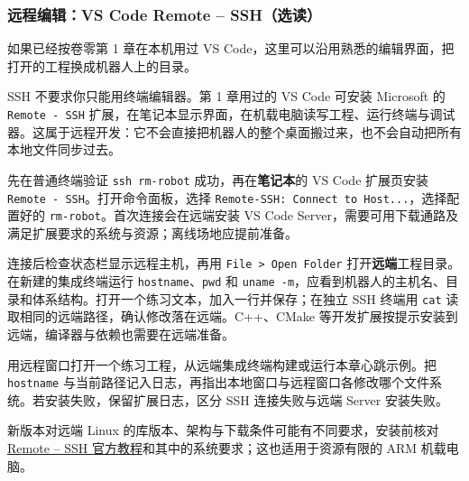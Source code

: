 \subsubsection{远程编辑：VS Code Remote -- SSH（选读）}
如果已经按卷零第 1 章在本机用过 VS Code，这里可以沿用熟悉的编辑界面，把打开的工程换成机器人上的目录。


SSH 不要求你只能用终端编辑器。第 1 章用过的 VS Code 可安装 Microsoft 的 \texttt{Remote - SSH} 扩展，在笔记本显示界面，在机载电脑读写工程、运行终端与调试器。这属于远程开发：它不会直接把机器人的整个桌面搬过来，也不会自动把所有本地文件同步过去。

\begin{example}[确认编辑与编译发生在哪台电脑]
先在普通终端验证 \texttt{ssh rm-robot} 成功，再在\textbf{笔记本}的 VS Code 扩展页安装 \texttt{Remote - SSH}。打开命令面板，选择 \texttt{Remote-SSH: Connect to Host...}，选择配置好的 \texttt{rm-robot}。首次连接会在远端安装 VS Code Server，需要可用下载通路及满足扩展要求的系统与资源；离线场地应提前准备。

连接后检查状态栏显示远程主机，再用 \texttt{File > Open Folder} 打开\textbf{远端}工程目录。在新建的集成终端运行 \texttt{hostname}、\texttt{pwd} 和 \texttt{uname -m}，应看到机器人的主机名、目录和体系结构。打开一个练习文本，加入一行并保存；在独立 SSH 终端用 \texttt{cat} 读取相同的远端路径，确认修改落在远端。C++、CMake 等开发扩展按提示安装到远端，编译器与依赖也需要在远端准备。
\end{example}

\begin{exercise}\label{ex:deploy-remote-editor}
用远程窗口打开一个练习工程，从远端集成终端构建或运行本章心跳示例。把 \texttt{hostname} 与当前路径记入日志，再指出本地窗口与远程窗口各修改哪个文件系统。若安装失败，保留扩展日志，区分 SSH 连接失败与远端 Server 安装失败。
\end{exercise}

新版本对远端 Linux 的库版本、架构与下载条件可能有不同要求，安装前核对 \href{https://code.visualstudio.com/docs/remote/ssh}{Remote -- SSH 官方教程}和其中的系统要求；这也适用于资源有限的 ARM 机载电脑。
